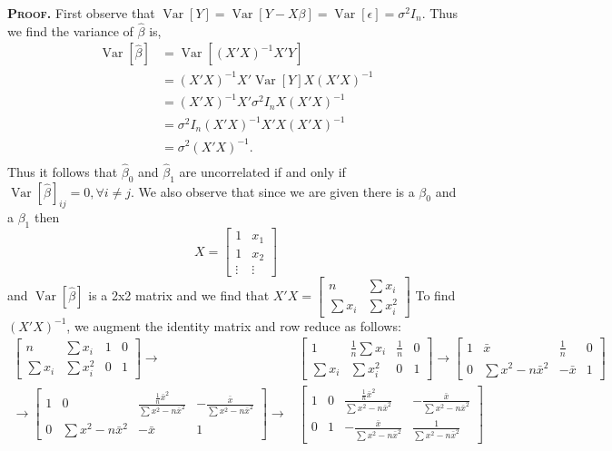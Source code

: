 \documentclass{article}
\newcommand{\Var}{\operatorname{Var}} %
\begin{document}
 \vspace{4mm} 
\textbf{\textsc{Proof.} } First observe that \(\Var[Y] = \Var[Y-X\beta] = \Var[\epsilon] = \sigma^2 I_n \). Thus we find the variance of \( \hat \beta \) is, 
\begin{align*}
\Var[\hat \beta] &= \Var[ (X'X)^{-1} X' Y] \\ 
&= (X'X)^{-1} X' \Var[Y] X(X'X)^{-1}  \\
&= (X'X)^{-1} X' \sigma^2 I_n X(X'X)^{-1}  \\
&= \sigma^2 I_n(X'X)^{-1} X'  X(X'X)^{-1}  \\
&= \sigma^2 (X'X)^{-1}.  \\
\end{align*}
Thus it follows that \( \hat \beta_0\) and \(\hat \beta_1\) are uncorrelated if and only if \(\Var[\hat \beta]_{ij} = 0, \forall i\neq j\). We also observe that since we are given there is a \(\beta_0\) and a \(\beta_1\) then 
\[
 X = \begin{bmatrix}
 1 & x_{1}\\
 1 &  x_{2} \\
 \vdots&\vdots
 \end{bmatrix}
 \] 
 and \(\Var[\hat \beta]\) is a 2x2 matrix and we find that \(X'X= \begin{bmatrix} n&\sum x_i \\ \sum x_i &\sum x_i^2\end{bmatrix}\) To find \((X'X)^{-1}\), we augment the identity matrix and row reduce as follows:
 \begin{align*}
\begin{bmatrix} n&\sum x_i  &1&0\\ 
 \sum x_i &\sum x_i^2 & 0 & 1 \end{bmatrix} 
 \rightarrow&
 \begin{bmatrix} 1&\frac1n\sum x_i  & \frac1n&0\\ 
 \sum x_i &\sum x_i^2 & 0 & 1 \end{bmatrix} 
  \rightarrow
 \begin{bmatrix} 1& \bar x & \frac1n&0\\ 
0& \sum x^2 -n\bar x^2  & -\bar x & 1 \end{bmatrix} \\
  \rightarrow
 \begin{bmatrix} 1& 0  & \frac{\frac1n \bar x^2}{\sum x^2- n\bar x^2}&-\frac{\bar x}{\sum x^2- n\bar x^2}\\ 
0& \sum x^2 -n\bar x^2  & -\bar x & 1 \end{bmatrix} \rightarrow& 
 \begin{bmatrix} 1& 0  & \frac{\frac1n \bar x^2}{\sum x^2- n\bar x^2}&-\frac{\bar x}{\sum x^2- n\bar x^2}\\ 
0& 1  & -\frac{\bar x}{\sum x^2- n\bar x^2} & \frac{1}{\sum x^2- n\bar x^2} \end{bmatrix}
 \end{align*}
 
\end{document}
